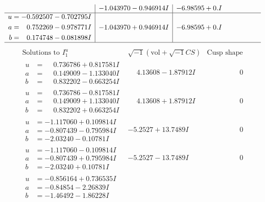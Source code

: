 \documentclass[1p]{elsarticle_modified}
\theoremstyle{definition}
\newcommand{\I}{\sqrt{-1}}
\begin{document}
$$\begin{array}{c|c|c}
 & -1.043970 - 0.946914 I & -6.98595 + 0. I\phantom{ +0.000000I} \\ \hline\begin{aligned}
u &= -0.592507 - 0.702795 I \\
a &= \phantom{-}0.752269 - 0.978771 I \\
b &= \phantom{-}0.174748 - 0.081898 I\end{aligned}
 & -1.043970 + 0.946914 I & -6.98595 + 0. I\phantom{ +0.000000I}\\
 \hline 
 \end{array}$$\newpage$$\begin{array}{c|c|c}  
\text{Solutions to }I^u_{1}& \I (\text{vol} + \sqrt{-1}CS) & \text{Cusp shape}\\
 \hline 
\begin{aligned}
u &= \phantom{-}0.736786 + 0.817581 I \\
a &= \phantom{-}0.149009 - 1.133040 I \\
b &= \phantom{-}0.832202 - 0.663254 I\end{aligned}
 & \phantom{-}4.13608 - 1.87912 I & \phantom{-0.000000 } 0 \\ \hline\begin{aligned}
u &= \phantom{-}0.736786 - 0.817581 I \\
a &= \phantom{-}0.149009 + 1.133040 I \\
b &= \phantom{-}0.832202 + 0.663254 I\end{aligned}
 & \phantom{-}4.13608 + 1.87912 I & \phantom{-0.000000 } 0 \\ \hline\begin{aligned}
u &= -1.117060 + 0.109814 I \\
a &= -0.807439 - 0.795984 I \\
b &= -2.03240 - 0.10781 I\end{aligned}
 & -5.2527 + 13.7489 I & \phantom{-0.000000 } 0 \\ \hline\begin{aligned}
u &= -1.117060 - 0.109814 I \\
a &= -0.807439 + 0.795984 I \\
b &= -2.03240 + 0.10781 I\end{aligned}
 & -5.2527 - 13.7489 I & \phantom{-0.000000 } 0 \\ \hline\begin{aligned}
u &= -0.856164 + 0.736535 I \\
a &= -0.84854 - 2.26839 I \\
b &= -1.46492 - 1.86228 I\end{aligned}

\end{array}$$
\end{document}
